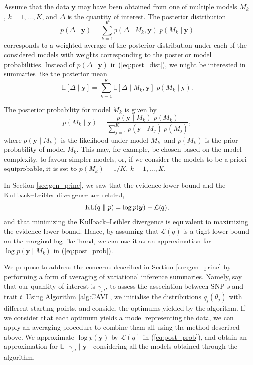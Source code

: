 \documentclass[a4paper, 11pt]{report}
\numberwithin{equation}{chapter}
\DeclareMathOperator*{\KL}{{\rm KL}}
\begin{document}
Assume that the data $\boldsymbol{y}$ may have been obtained from one of multiple models $M_k$, $k= 1,\ldots,K$, and $\Delta$ is the quantity of interest. The posterior distribution
\begin{equation}
p(\Delta \mid \boldsymbol{y}) = \sum_{k=1}^K p(\Delta \mid M_k,\boldsymbol{y}) \; p(M_k \mid \boldsymbol{y})
\label{eq:post_dist}
\end{equation}
corresponds to a weighted average of the posterior distribution under each of the considered models with weights corresponding to the posterior model probabilities. Instead of $p(\Delta \mid \boldsymbol{y})$ in (\ref{eq:post_dist}), we might be interested in summaries like the posterior mean
\begin{equation*}
\mathbb{E}\left[\Delta \mid \boldsymbol{y}\right] = \sum_{k=1}^K\mathbb{E}\left[\Delta \mid M_k, \boldsymbol{y}\right]\;p(M_k \mid \boldsymbol{y}).
\end{equation*}

The posterior probability for model $M_k$ is given by
\begin{equation}
p(M_k \mid \boldsymbol{y}) = \frac{p(\boldsymbol{y} \mid M_k)\; p(M_k)}{\sum_{j=1}^K p(\boldsymbol{y} \mid M_j)\; p(M_j)},
\label{eq:post_prob}
\end{equation}
where $p(\boldsymbol{y} \mid M_k)$ is the likelihood under model $M_k$, and $p(M_k)$ is the prior probability of model $M_k$. This may, for example, be chosen based on the model complexity, to favour simpler models, or, if we consider the models to be a priori equiprobable, it is set to $p(M_k) = 1/K$, $k = 1,\ldots,K$.  

In Section \ref{sec:gen_princ}, we saw that the evidence lower bound and the Kullback--Leibler divergence are related, 
\begin{equation*}
\KL(q\parallel p) = \log p (\boldsymbol{y}) - \mathcal{L}(q),
\end{equation*}
and that minimizing the Kullback--Leibler divergence is equivalent to maximizing the evidence lower bound. Hence, by assuming that $\mathcal{L}(q)$ is a tight lower bound on the marginal log likelihood, we can use it as an approximation for $\log p(\boldsymbol{y}\mid M_k)$ in (\ref{eq:post_prob}).

We propose to address the concerns described in Section \ref{sec:gen_princ} by performing a form of averaging of variational inference summaries. Namely, say that our quantity of interest is $\gamma_{st}$, to assess the association between SNP $s$ and trait $t$. Using Algorithm \ref{alg:CAVI}, we initialise the distributions $q_j(\theta_j)$ with different starting points, and consider the optimums yielded by the algorithm. If we consider that each optimum yields a model representing the data, we can apply an averaging procedure to combine them all using the method described above. We approximate $\log p(\boldsymbol{y})$ by $\mathcal{L}(q)$ in (\ref{eq:post_prob}), and obtain an approximation for $\mathbb{E}\left[\gamma_{st}\mid \boldsymbol{y}\right]$ considering all the models obtained through the algorithm.
\end{document}
